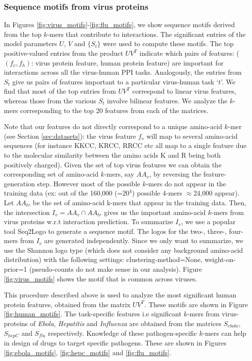 \documentclass[runningheads,a4paper]{llncs}
\begin{document}
\subsubsection{Sequence motifs from virus proteins}
In Figures \ref{fig:virus_motifs}-\ref{fig:flu_motifs}, we show sequence motifs derived from the top $k$-mers that contribute to interactions. The significant entries of the model parameters $U$, $V$ and $\{S_t\}$ were used to 
compute these motifs. The top positive-valued entries from the product $U V^T$ indicate which pairs of features: ($(f_v, f_h)$: virus protein feature, human protein feature) are important for interactions across all the virus-human PPI tasks.
Analogously, the entries from $S_t$ give us pairs of features important to a particular virus-human task `$t$'.
We find that most of the top entries from $U V^T$ correspond to linear virus features, whereas those from the various $S_t$
involve bilinear features. We analyze the $k$-mers corresponding to the top 20 features from each of the matrices.

Note that our features do not directly correspond to a unique amino-acid $k$-mer (see Section \ref{sec:datasets}): 
the virus feature $f_v$ will map to several amino-acid sequences (for instance KKCC, KRCC, RRCC etc all map to a single feature due to the molecular similarity between the amino acids K and R being both positively charged). Given the set of top virus features we can obtain the corresponding set of 
amino-acid $k$-mers, say $AA_v$, by reversing the feature-generation step. However most of the possible $k$-mers do not appear in the 
training data (ex: out of the 160,000 (=$20^4$) possible 4-mers $\approx$24,000 appear). Let $AA_{tr}$
be the set of amino-acid k-mers that appear in the training data. Then, the intersection $I_v = AA_v \cap AA_{tr}$ gives us the important amino-acid $k$-mers from virus proteins w.r.t interaction prediction. 
To summarize $I_v$, we use a popular tool Seq2Logo \citep{seq2logo} to generate a sequence motif. 
The logos for the two-, three-, four-mers from $I_v$ are generated independently. Since we only
want to summarize, we use the Shannon logo type (which does not consider any background amino-acid distribution)
with the following settings: clustering-method=None, weight-on-prior=1 (pseudo-counts do not make sense in our
analysis). Figure \ref{fig:virus_motifs} shows the motif that is common across viruses. %

This procedure described above is used to analyze the most significant human protein features, obtained from
the matrix $U V^T$. These motifs are shown in Figure \ref{fig:human_motifs}. The task-specific features i.e significant $k$-mers from virus-proteins of \textit{Ebola}, \textit{Hepatitis} and \textit{Influenza} are obtained from the matrices $S_{ebola}$, $S_{hepC}$ and $S_{flu}$ respectively. Knowledge of these pathogen-specific $k$-mers can help in design of drugs to target specific pathogens. These are shown in Figures \ref{fig:ebola_motifs}, \ref{fig:hepc_motifs} and
\ref{fig:flu_motifs}.
\end{document}
